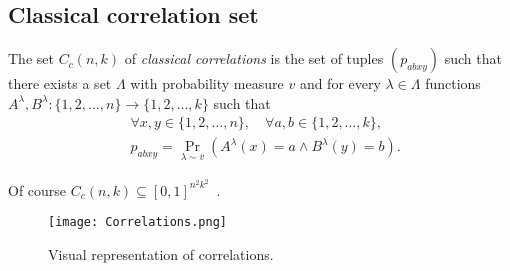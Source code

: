 
\subsection{Classical correlation set}\label{sec:classical-correlation-set}

\begin{defn}\label{defn:classical-correlation-set}
    The set $C_{c}(n, k)$ of \emph{classical correlations} is the set of tuples $\left(p_{a b x y}\right)$ such that there exists a set $\Lambda$ with probability measure $v$ and for every $\lambda \in \Lambda$ functions $A^{\lambda}, B^{\lambda}:\{1,2, \ldots, n\} \rightarrow\{1,2, \ldots, k\}$ such that
    \begin{equation}
        \begin{split}
    &\forall x, y \in\{1,2, \ldots, n\}, \quad \forall a, b \in\{1,2, \ldots, k\}, \\
     &p_{a b x y}  =\operatorname{Pr}_{\lambda \sim v}\left(A^{\lambda}(x)=a \wedge B^{\lambda}(y)=b\right) .
        \end{split}
    \end{equation}

    Of course $C_{c}(n, k) \subseteq [0,1]^{n^2k^2}$~\cite{mipre}.
\end{defn}


\begin{figure}[htb]
    \texttt{[image: Correlations.png]}
    \centering
    \caption{Visual representation of correlations.}
    \end{figure}